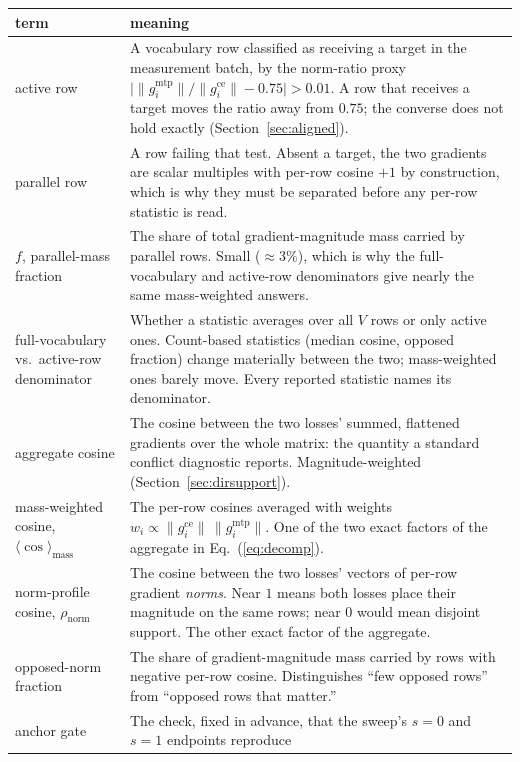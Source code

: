 \begin{table}[t]
\centering
\small
\begin{tabular}{p{}p{}}
\toprule
term & meaning \\
\midrule
active row &
A vocabulary row classified as receiving a target in the measurement batch, by
the norm-ratio proxy $\lvert\lVert g^{\text{mtp}}_i\rVert/\lVert
g^{\text{ce}}_i\rVert - 0.75\rvert > 0.01$. A row that receives a target moves
the ratio away from $0.75$; the converse does not hold exactly
(Section~\ref{sec:aligned}). \\[2pt]
parallel row &
A row failing that test. Absent a target, the two gradients are scalar multiples
with per-row cosine $+1$ by construction, which is why they must be separated
before any per-row statistic is read. \\[2pt]
$f$, parallel-mass fraction &
The share of total gradient-magnitude mass carried by parallel rows. Small
($\approx 3\%$), which is why the full-vocabulary and active-row denominators
give nearly the same mass-weighted answers. \\[2pt]
full-vocabulary vs.\ active-row denominator &
Whether a statistic averages over all $V$ rows or only active ones. Count-based
statistics (median cosine, opposed fraction) change materially between the two;
mass-weighted ones barely move. Every reported statistic names its denominator. \\[2pt]
aggregate cosine &
The cosine between the two losses' summed, flattened gradients over the whole
matrix: the quantity a standard conflict diagnostic reports. Magnitude-weighted
(Section~\ref{sec:dirsupport}). \\[2pt]
mass-weighted cosine, $\langle\cos\rangle_{\text{mass}}$ &
The per-row cosines averaged with weights $w_i \propto \lVert
g^{\text{ce}}_i\rVert\,\lVert g^{\text{mtp}}_i\rVert$. One of the two exact
factors of the aggregate in Eq.~(\ref{eq:decomp}). \\[2pt]
norm-profile cosine, $\rho_{\text{norm}}$ &
The cosine between the two losses' vectors of per-row gradient \emph{norms}. Near
$1$ means both losses place their magnitude on the same rows; near $0$ would mean
disjoint support. The other exact factor of the aggregate. \\[2pt]
opposed-norm fraction &
The share of gradient-magnitude mass carried by rows with negative per-row
cosine. Distinguishes ``few opposed rows'' from ``opposed rows that matter.'' \\[2pt]
anchor gate &
The check, fixed in advance, that the sweep's $s{=}0$ and $s{=}1$ endpoints reproduce

\end{tabular}
\end{table}
